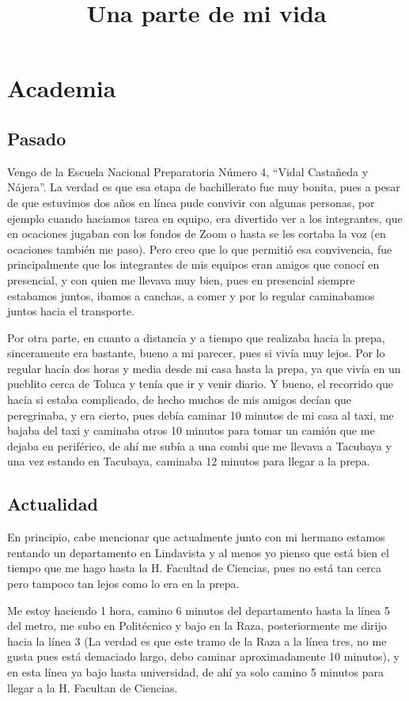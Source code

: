 \documentclass[letterpaper,12pt]{article}
\title{\Huge{Una parte de mi vida}}
\author{\normal{Esteban Villa Rosas }}
\date{\normlal{September 12, 2022}}
\begin{document}
\maketitle

\section{\huge{Academia}}
    \subsection{\Large{Pasado}} \large{Vengo de la Escuela Nacional Preparatoria Número 4, ``Vidal Castañeda y Nájera''. La verdad es que esa etapa de bachillerato fue muy bonita, pues a pesar de que estuvimos dos años en línea pude convivir con algunas personas, por ejemplo cuando haciamos tarea en equipo, era divertido ver a los integrantes, que en ocaciones jugaban con los fondos de Zoom o hasta se les cortaba la voz (en ocaciones también me paso). Pero creo que lo que permitió esa convivencia, fue principalmente que los integrantes de mis equipos eran amigos que conocí en presencial, y con quien me llevava muy bien, pues en presencial siempre estabamos juntos, ibamos a canchas, a comer y por lo regular caminabamos juntos hacia el transporte.
    
    Por otra parte, en cuanto a distancia y a tiempo que realizaba hacia la prepa, sinceramente era bastante, bueno a mi parecer, pues si vivía muy lejos. Por lo regular hacía dos horas y media desde mi casa hasta la prepa, ya que vivía en un pueblito cerca de Toluca y tenía que ir y venir diario. Y bueno, el recorrido que hacía si estaba complicado, de hecho muchos de mis amigos decían que peregrinaba, y era cierto, pues debía caminar 10 minutos de mi casa al taxi, me bajaba del taxi y caminaba otros 10 minutos para tomar un camión que me dejaba en periférico, de ahí me subía a una combi que me llevava a Tacubaya y una vez estando en  Tacubaya, caminaba 12 minutos para llegar a la prepa.}
    
    \subsection{\Large{Actualidad}} \large{En principio, cabe mencionar que actualmente junto con mi hermano estamos rentando un departamento en Lindavista y al menos yo pienso que está bien el tiempo que me hago hasta la H. Facultad de Ciencias, pues no está tan cerca pero tampoco tan lejos como lo era en la prepa. 
    
    Me estoy haciendo 1 hora, camino 6 minutos del departamento hasta la línea 5 del metro, me subo en Politécnico y bajo en la Raza, posteriormente me dirijo hacia la línea 3 (La verdad es que este tramo de la Raza a la línea tres, no me gusta pues está demaciado largo, debo caminar aproximadamente 10 minutos), y en esta línea ya bajo hasta universidad, de ahí ya solo camino 5 minutos para llegar a la H. Facultan de Ciencias.}
    
\end{document}
